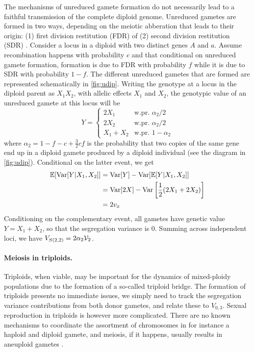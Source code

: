 \documentclass[11pt,a4paper]{article}
\begin{document}
The mechanisms of unreduced gamete formation do not necessarily lead to a
faithful transmission of the complete diploid genome.
Unreduced gametes are formed in two ways, depending on the meiotic abberation
that leads to their origin: (1) first division restitution (FDR) of (2) second
division restitution (SDR) \citep{bretagnolle1995,storme2013}.
Consider a locus in a diploid with two distinct genes $A$ and $a$. Assume
recombination happens with probability $c$ and that conditional on unreduced
gamete formation, formation is due to FDR with probability $f$ while it is due
to SDR with probability $1-f$.
The different unreduced gametes that are formed are represented schematically
in \cref{fig:udip}.
Writing the genotype at a locus in the diploid parent as $X_1X_2$, with allelic
effects $X_1$ and $X_2$, the genotypic value of an unreduced gamete at this
locus will be
$$Y = \begin{cases}
    2X_1 & \text{w.pr.  } \alpha_2/2 \\
    2X_2 & \text{w.pr.  } \alpha_2/2 \\
    X_1 + X_2 & \text{w.pr.  } 1-\alpha_2 
    \end{cases}$$
where $\alpha_2 = 1 - f - c + \frac{3}{2}cf$ is the probability that two copies
of the same gene end up in a diploid gamete produced by a diploid individual
(see the diagram in \cref{fig:udip}). 
Conditional on the latter event, we get
\begin{align*}
\mathbb{E}[\mathrm{Var}[Y|X_1,X_2]] &= \mathrm{Var}[Y] - \mathrm{Var}[\mathbb{E}[Y|X_1,X_2]] \\
    &= \mathrm{Var}[2X] - \mathrm{Var}\left[\frac{1}{2}(2X_1 + 2X_2)\right] \\
    &= 2v_x
\end{align*}
Conditioning on the complementary event, all gametes have genetic value
$Y = X_1+X_2$, so that the segregation variance is 0.
Summing across independent loci, we have $V_{S(2,2)} = 2\alpha_2 \mathcal{V}_{2}$.


\paragraph{Meiosis in triploids.}

Triploids, when viable, may be important for the dynamics of mixed-ploidy
populations due to the formation of a so-called triploid bridge.
The formation of triploids presents no immediate issues, we simply need to
track the segregation variance contributions from both donor gametes, and
relate these to $V_{0,3}$.
Sexual reproduction in triploids is however more complicated.
There are no known mechanisms to coordinate the assortment of chromosomes in
for instance a haploid and diploid gamete, and meiosis, if it happens, usually
results in aneuploid gametes \citep{ramsey1998}.
\end{document}
